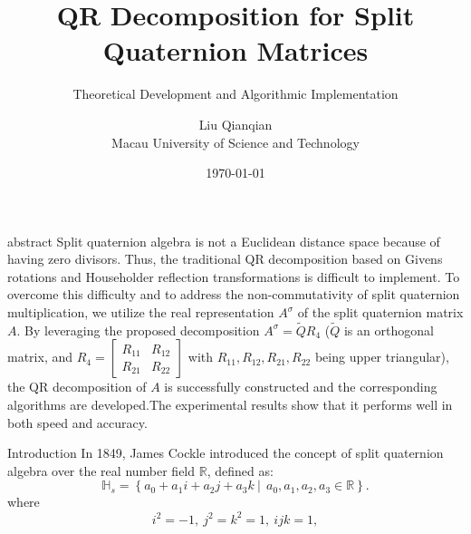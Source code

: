 \documentclass{beamer}
\title{QR Decomposition for Split Quaternion Matrices}
\subtitle{Theoretical Development and Algorithmic Implementation}
\author{Liu Qianqian \\ \small Macau University of Science and Technology}
\date{\today}
\begin{document}
\begin{frame}
  \titlepage
\end{frame}

\begin{frame}{abstract}
Split quaternion algebra is not a Euclidean distance space because of having zero divisors. Thus, the traditional QR decomposition based on Givens rotations and Householder reflection transformations is difficult to implement. To overcome this difficulty and to address the non-commutativity of split quaternion multiplication, we utilize the real representation $A^\sigma$ of the split quaternion matrix $A$. By leveraging the proposed decomposition $A^\sigma = \widetilde{Q}R_4$ ($\widetilde{Q}$ is an orthogonal matrix, and $R_4 = \begin{bmatrix} R_{11} & R_{12} \\ R_{21} & R_{22} \end{bmatrix}$ with $R_{11}, R_{12}, R_{21}, R_{22}$ being upper triangular), the QR decomposition of $A$ is successfully constructed and the corresponding algorithms are developed.The experimental results show that it performs well in both speed and accuracy.
\end{frame}
\begin{frame}{Introduction}
  In 1849, James Cockle \cite{Cockle1849} introduced the concept of split quaternion algebra over the real number field $\mathbb{R}$, defined as:
  \begin{equation*}
    \mathbb{H}_s = \left\{ a_0 + a_1 i + a_2 j + a_3 k \ \bigg| \ 
     \ a_0, a_1, a_2, a_3 \in \mathbb{R}
    \right\}.
  \end{equation*}
where
   \begin{equation*}
       i^2 = -1,\ j^2 = k^2 = 1,  \ ijk = 1,
   \end{equation*}
\end{frame}
\end{document}
